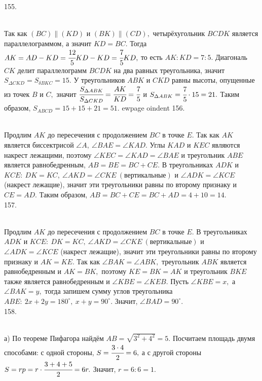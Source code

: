 155. \begin{figure}[ht!]
\end{figure}\\
Так как $(BC)\parallel (KD)$ и $(BK)\parallel(CD),$ четырёхугольник $BCDK$ является параллелограммом, а значит $KD=BC.$ Тогда $AK=AD-KD=\cfrac{12}{5}KD-KD=\cfrac{7}{5}KD,$ то есть $AK:KD=7:5.$ Диагональ $CK$ делит параллелограмм $BCDK$ на два равных треугольника, значит $S_{\Delta CKD}=S_{\delta BKC}=15.$ У треугольников $ABK$ и $CKD$ равны высоты, опущенные из точек $B$ и $C,$ значит $\cfrac{S_{\Delta ABK}}{S_{\Delta CKD}}=\cfrac{AK}{KD}=\cfrac{7}{5}$ и $S_{\Delta ABK}=\cfrac{7}{5}\cdot15=21.$ Таким образом, $S_{ABCD}=15+15+21=51.$
ewpage
oindent
156. \begin{figure}[ht!]
\end{figure}\\
Продлим $AK$ до пересечения с продолжением $BC$ в точке $E.$ Так как $AK$ является биссектрисой $\angle A,\ \angle BAE=\angle KAD.$ Углы $KAD$ и $KEC$ являются накрест лежащими, поэтому $\angle KEC=\angle KAD=\angle BAE$ и треугольник $ABE$ является равнобедренным, $AB=BE=BC+CE.$ В треугольниках $ADK$ и $KCE:\ DK=KC,\ \angle AKD=\angle CKE\ (\text{вертикальные})$ и $\angle ADK=\angle KCE$ (накрест лежащие), значит эти треугольники равны по второму признаку и $CE=AD.$ Таким образом, $AB=BC+CE=BC+AD=4+10=14.$\\
157. \begin{figure}[ht!]
\end{figure}\\
Продлим $AK$ до пересечения с продолжением $BC$ в точке $E.$  В треугольниках $ADK$ и $KCE:\ DK=KC,\ \angle AKD=\angle CKE\ (\text{вертикальные})$ и $\angle ADK=\angle KCE$ (накрест лежащие), значит эти треугольники равны по второму признаку и $AK=KE.$ Так как $\angle BAK=\angle ABK,$ треугольник $ABK$ является равнобедренным и $AK=BK,$ поэтому $KE=BK=AK$ и треугольник $BKE$ также является равнобедренным и  $\angle KBE=\angle KEB.$ Пусть $\angle KBE=x,$ а $\angle BAK=y,$ тогда запишем сумму углов треугольника $ABE:\ 2x+2y=180^\circ,\ x+y=90^\circ.$ Значит, $\angle BAD=90^\circ.$\\
158. \begin{figure}[ht!]
\end{figure}\\
а) По теореме Пифагора найдём $AB=\sqrt{3^2+4^2}=5.$ Посчитаем площадь двумя способами: с одной стороны, $S=\cfrac{3\cdot4}{2}=6,$ а с другой стороны $S=rp=r\cdot\cfrac{3+4+5}{2}=6r.$ Значит, $r=6:6=1.$\\
